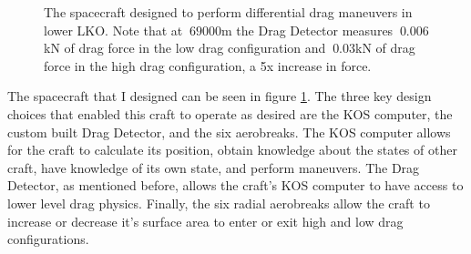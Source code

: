 \documentclass[journal,a4paper,12pt]{IEEEtran}
\begin{document}
\begin{figure}[h!]
  \centering
  \caption{The spacecraft designed to perform differential drag maneuvers in lower LKO.
  Note that at $~69000$m the Drag Detector measures $~0.006$kN of drag force in the low drag configuration
  and $~0.03$kN of drag force in the high drag configuration, a 5x increase in force. }
  \label{Kerbin_sat}
\end{figure}

The spacecraft that I designed can be seen in figure \ref{Kerbin_sat}. The three key
design choices that enabled this craft to operate as desired are the KOS computer,
the custom built Drag Detector, and the six aerobreaks. The KOS computer allows for
the craft to calculate its position, obtain knowledge about the states of other
craft, have knowledge of its own state, and perform maneuvers. The Drag Detector,
as mentioned before, allows the craft's KOS computer to have access to lower level
drag physics. Finally, the six radial aerobreaks allow the craft to increase or
decrease it's surface area to enter or exit high and low drag configurations.
\end{document}
